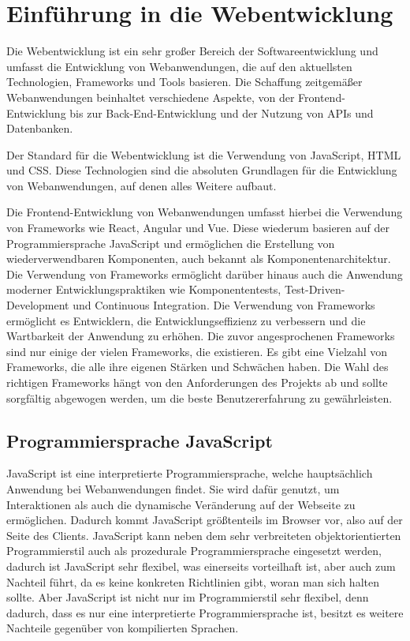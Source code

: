 \section{Einführung in die Webentwicklung}

Die Webentwicklung ist ein sehr großer Bereich der Softwareentwicklung und umfasst die Entwicklung von Webanwendungen, die auf den aktuellsten Technologien, Frameworks und Tools basieren. Die Schaffung zeitgemäßer Webanwendungen beinhaltet verschiedene Aspekte, von der Frontend-Entwicklung bis zur Back-End-Entwicklung und der Nutzung von \acf{API}s und Datenbanken.

Der Standard für die Webentwicklung ist die Verwendung von JavaScript, \acf{HTML} und \acf{CSS}. Diese Technologien sind die absoluten Grundlagen für die Entwicklung von Webanwendungen, auf denen alles Weitere aufbaut.

Die Frontend-Entwicklung von Webanwendungen umfasst hierbei die Verwendung von Frameworks wie React, Angular und Vue. Diese wiederum basieren auf der Programmiersprache JavaScript und ermöglichen die Erstellung von wiederverwendbaren Komponenten, auch bekannt als Komponentenarchitektur. Die Verwendung von Frameworks ermöglicht darüber hinaus auch die Anwendung moderner Entwicklungspraktiken wie Komponententests, Test-Driven-Development und Continuous Integration. Die Verwendung von Frameworks ermöglicht es Entwicklern, die Entwicklungseffizienz zu verbessern und die Wartbarkeit der Anwendung zu erhöhen. Die zuvor angesprochenen Frameworks sind nur einige der vielen Frameworks, die existieren. Es gibt eine Vielzahl von Frameworks, die alle ihre eigenen Stärken und Schwächen haben. Die Wahl des richtigen Frameworks hängt von den Anforderungen des Projekts ab und sollte sorgfältig abgewogen werden, um die beste Benutzererfahrung zu gewährleisten.\cite{modern-webdevelopment:1, modern-webdevelopment:2}

\subsection{Programmiersprache JavaScript}
\label{chapter:3-javaScript}

JavaScript ist eine interpretierte Programmiersprache, welche hauptsächlich Anwendung bei Webanwendungen findet. Sie wird dafür genutzt, um Interaktionen als auch die dynamische Veränderung auf der Webseite zu ermöglichen. Dadurch kommt JavaScript größtenteils im Browser vor, also auf der Seite des Clients. JavaScript kann neben dem sehr verbreiteten objektorientierten Programmierstil auch als prozedurale Programmiersprache eingesetzt werden, dadurch ist JavaScript sehr flexibel, was einerseits vorteilhaft ist, aber auch zum Nachteil führt, da es keine konkreten Richtlinien gibt, woran man sich halten sollte. Aber JavaScript ist nicht nur im Programmierstil sehr flexibel, denn dadurch, dass es nur eine interpretierte Programmiersprache ist, besitzt es weitere Nachteile gegenüber von kompilierten Sprachen.

